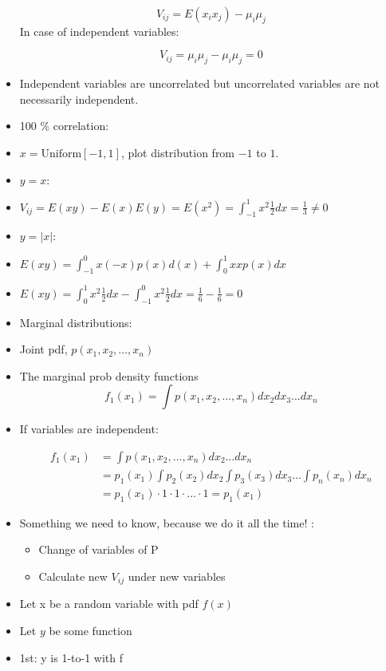 \begin{itemize}
    \[ V_{ij} = E(x_i x_j) - \mu_i \mu_j\]
    In case of independent variables:

    \[ V_{ij} = \mu_i \mu_j - \mu_i \mu_j = 0 \]

    \item Independent variables are uncorrelated but uncorrelated variables are not necessarily independent.
    \item 100 \% correlation: 
    \item $ x = \text{Uniform} [-1, 1]$, plot distribution from $-1$ to $1$.
    \item $y=x$:
    \item $V_{ij} = E(xy)-E(x)E(y)= E(x^2) = \int_{-1}^{1} x^2 \frac{1}{2} dx = \frac{1}{3} \neq 0$
    \item $y=|x|$:
    \item $E(xy) = \int_{-1}^{0} x(-x) p(x) d(x)   + \int_0^{1}  x x p(x)dx$
    \item $ E(xy) = \int_0^{1} x^2 \frac{1}{2} dx - \int_{-1}^{0} x^2 \frac{1}{2} dx = \frac{1}{6} - \frac{1}{6} = 0$

    \item Marginal distributions:
    
    \item Joint pdf, $p(x_1, x_2, \ldots, x_n)$
    \item The marginal prob density functions 
    \[ f_1(x_1) = \int p(x_1, x_2, \ldots, x_n) dx_2 dx_3\ldots dx_n \]

    \item If variables are independent:
    
    \begin{align*}
        f_1(x_1) &= \int p(x_1, x_2, \ldots, x_n) dx_2 \ldots dx_n \\
        &= p_1(x_1) \int p_2(x_2) dx_2 \int p_3(x_3) dx_3 \ldots \int p_n(x_n) dx_n \\
        &= p_1(x_1) \cdot 1 \cdot 1 \cdot \ldots \cdot 1 = p_1(x_1)
    \end{align*}

    \item Something we need to know, because we do it all the time! :
    \begin{itemize}
        \item Change of variables of P
        \item Calculate new $V_{ij}$ under new variables
    \end{itemize}

    \item Let x be a random variable with pdf $f(x)$
    \item Let $y$ be some function
    \item 1st: y is 1-to-1 with f    
    

\end{itemize}
